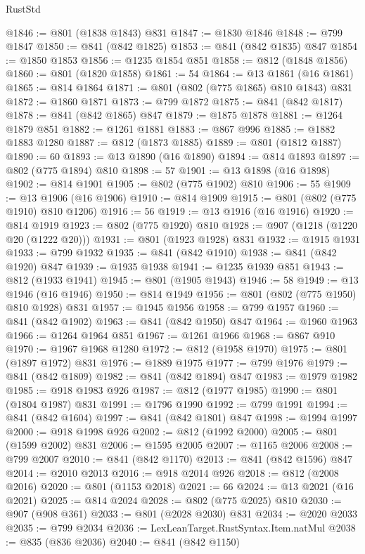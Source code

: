 \begin{lexlean}{RustStd}
\begin{coremodule}
@1846 := @801 (@1838 @1843) @831
@1847 := @1830 @1846
@1848 := @799 @1847
@1850 := @841 (@842 @1825)
@1853 := @841 (@842 @1835) @847
@1854 := @1850 @1853
@1856 := @1235 @1854 @851
@1858 := @812 (@1848 @1856)
@1860 := @801 (@1820 @1858)
@1861 := 54
@1864 := @13 @1861 (@16 @1861)
@1865 := @814 @1864
@1871 := @801 (@802 (@775 @1865) @810 @1843) @831
@1872 := @1860 @1871
@1873 := @799 @1872
@1875 := @841 (@842 @1817)
@1878 := @841 (@842 @1865) @847
@1879 := @1875 @1878
@1881 := @1264 @1879 @851
@1882 := @1261 @1881
@1883 := @867 @996
@1885 := @1882 @1883 @1280
@1887 := @812 (@1873 @1885)
@1889 := @801 (@1812 @1887)
@1890 := 60
@1893 := @13 @1890 (@16 @1890)
@1894 := @814 @1893
@1897 := @802 (@775 @1894) @810
@1898 := 57
@1901 := @13 @1898 (@16 @1898)
@1902 := @814 @1901
@1905 := @802 (@775 @1902) @810
@1906 := 55
@1909 := @13 @1906 (@16 @1906)
@1910 := @814 @1909
@1915 := @801 (@802 (@775 @1910) @810 @1206)
@1916 := 56
@1919 := @13 @1916 (@16 @1916)
@1920 := @814 @1919
@1923 := @802 (@775 @1920) @810
@1928 := @907 (@1218 (@1220 @20 (@1222 @20)))
@1931 := @801 (@1923 @1928) @831
@1932 := @1915 @1931
@1933 := @799 @1932
@1935 := @841 (@842 @1910)
@1938 := @841 (@842 @1920) @847
@1939 := @1935 @1938
@1941 := @1235 @1939 @851
@1943 := @812 (@1933 @1941)
@1945 := @801 (@1905 @1943)
@1946 := 58
@1949 := @13 @1946 (@16 @1946)
@1950 := @814 @1949
@1956 := @801 (@802 (@775 @1950) @810 @1928) @831
@1957 := @1945 @1956
@1958 := @799 @1957
@1960 := @841 (@842 @1902)
@1963 := @841 (@842 @1950) @847
@1964 := @1960 @1963
@1966 := @1264 @1964 @851
@1967 := @1261 @1966
@1968 := @867 @910
@1970 := @1967 @1968 @1280
@1972 := @812 (@1958 @1970)
@1975 := @801 (@1897 @1972) @831
@1976 := @1889 @1975
@1977 := @799 @1976
@1979 := @841 (@842 @1809)
@1982 := @841 (@842 @1894) @847
@1983 := @1979 @1982
@1985 := @918 @1983 @926
@1987 := @812 (@1977 @1985)
@1990 := @801 (@1804 @1987) @831
@1991 := @1796 @1990
@1992 := @799 @1991
@1994 := @841 (@842 @1604)
@1997 := @841 (@842 @1801) @847
@1998 := @1994 @1997
@2000 := @918 @1998 @926
@2002 := @812 (@1992 @2000)
@2005 := @801 (@1599 @2002) @831
@2006 := @1595 @2005
@2007 := @1165 @2006
@2008 := @799 @2007
@2010 := @841 (@842 @1170)
@2013 := @841 (@842 @1596) @847
@2014 := @2010 @2013
@2016 := @918 @2014 @926
@2018 := @812 (@2008 @2016)
@2020 := @801 (@1153 @2018)
@2021 := 66
@2024 := @13 @2021 (@16 @2021)
@2025 := @814 @2024
@2028 := @802 (@775 @2025) @810
@2030 := @907 (@908 @361)
@2033 := @801 (@2028 @2030) @831
@2034 := @2020 @2033
@2035 := @799 @2034
@2036 := LexLeanTarget.RustSyntax.Item.natMul
@2038 := @835 (@836 @2036)
@2040 := @841 (@842 @1150)

\end{coremodule}
\end{lexlean}
